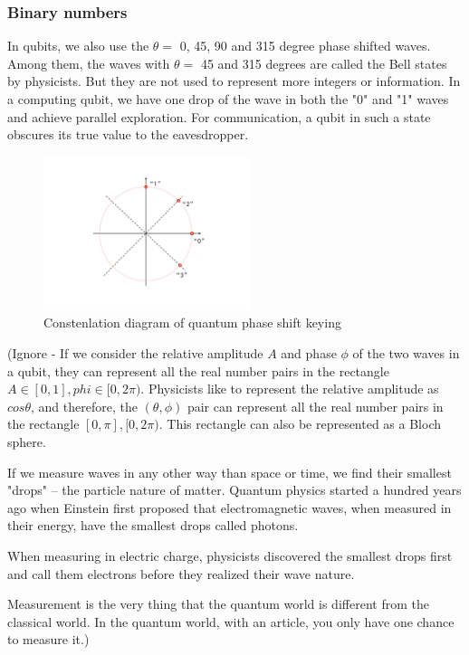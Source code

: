 \documentclass{book}
\begin{document}
\subsubsection{Binary numbers}
In qubits, we also use the $\theta =$ 0, 45, 90 and 315 degree phase shifted waves. Among them, the waves with $\theta =$ 45 and 315 degrees are called the Bell states by physicists. But they are not used to represent more integers or information. In a computing qubit, we have one drop of the wave in both the "0" and "1" waves and achieve parallel exploration. For communication, a qubit in such a state obscures its true value to the eavesdropper. 
\begin{figure}[htbp]
\includegraphics[width=6cm]{pic/qqpsk.jpg}
%
\caption{Constenlation diagram of quantum phase shift keying}
\label{qQPSK}
\end{figure}

(Ignore - If we consider the relative amplitude $A$ and phase $\phi$ of the two waves in a qubit, they can represent all the real number pairs in the rectangle ${ A \in [0,1], phi \in [0,2\pi) }$. Physicists like to represent the relative amplitude as $cos\theta$, and therefore, the $(\theta, \phi)$ pair can represent all the real number pairs in the rectangle ${[0,\pi],  [0,2\pi)}$. This rectangle can also be represented as a Bloch sphere.

If we measure waves in any other way than space or time, we find their smallest "drops" -- the particle nature of matter. Quantum physics started a hundred years ago when Einstein first proposed that electromagnetic waves, when measured in their energy, have the smallest drops called photons.

When measuring in electric charge, physicists discovered the smallest drops first and call them electrons before they realized their wave nature.

Measurement is the very thing that the quantum world is different from the classical world. In the quantum world, with an article, you only have one chance to measure it.)
\end{document}
